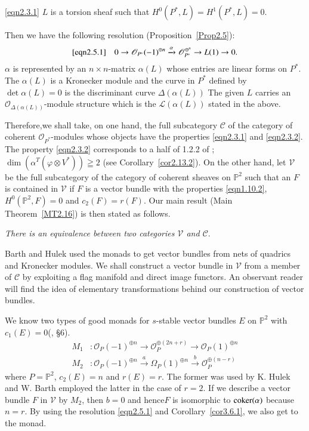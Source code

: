 \eqref{eqn2.3.1} $L$ is a torsion sheaf such that $H^{0}(P^{\ast},L)= H^{1}(P^{\ast},L)=0$.

Then we have the following resolution (Proposition~\ref{Prop2.5}):
$$\eqref{eqn2.5.1}
\quad 0\rightarrow\mathscr{O}_{P^{\ast}}(-1)^{\oplus
  n}\xrightarrow{\alpha}\mathscr{O}^{\oplus^{n}}_{P^{\ast}}\rightarrow
L(1)\rightarrow 0.
$$
$\alpha$ is represented by an $n\times n$-matrix $\alpha(L)$ whose
entries are linear forms on $P^{\ast}$. The $\alpha(L)$ is a Kronecker
module and the curve in $P^{\ast}$ defined by $\det \alpha(L)=0$ is
the discriminant curve $\Delta(\alpha(L))$ The given $L$ carries an
$\mathscr{O}_{\Delta(\alpha(L))}$-module structure which is the
$\mathscr{L}(\alpha(L))$ stated in the above.

Therefore,\pageoriginale we shall take, on one hand, the full subcategory
$\mathscr{C}$ of the category of coherent
$\mathscr{O}_{P^{\ast}}$-modules whose objects have the properties
\eqref{eqn2.3.1} and \eqref{eqn2.3.2}. The property \eqref{eqn2.3.2}
corresponds to a half of 1.2.2 of \cite{key7}; 
$\dim\left(\alpha^{T}(\varphi \otimes
V^{\ast})\right)\geqq 2$ (see Corollary~\ref{cor2.13.2}). On the other hand,
let $\mathscr{V}$ be the full subcategory of the category of coherent
sheaves on $\mathbb{P}^{2}$ such that an $F$ is contained in
$\mathscr{V}$ if $F$ is a vector bundle with the properties \eqref{eqn1.10.2},
$H^{0}\left(\mathbb{P}^{2},F\right)=0$ and $c_2(F)=r(F)$. Our main
result (Main Theorem~\ref{MT2.16}) is then stated as follows.

\begin{TM}
\textit{There is an equivalence between two categories $\mathscr{V}$ and $\mathscr{C}$}.
\end{TM}

Barth \cite{key2} and Hulek \cite{key7} used the monads to get vector
bundles from nets of quadrics and Kronecker modules. We shall
construct a vector bundle in $\mathscr{V}$ from a member of
$\mathscr{C}$ by exploiting a flag manifold and direct image
functors. An observant reader will find the idea of elementary
transformations behind our construction of vector bundles.

We know two types of good monads for $s$-stable vector bundles $E$ on
$\mathbb{P}^{2}$ with $c_1(E)=0$(\cite{key3}, \S 6).
\begin{align*}
M_1&:\mathscr{O}_P(-1)^{\oplus n}\rightarrow\mathscr{O}^{\oplus
  (2n+r)}_P\rightarrow \mathscr{O}_P(1)^{\oplus n}\\
M_2&: \mathscr{O}_P(-1)^{\oplus n}\xrightarrow{a}\Omega_P(1)^{\oplus
  n}\xrightarrow{b}\mathscr{O}_P^{\oplus (n-r)}
\end{align*}
where $P=\mathbb{P}^{2}$, $c_2(E)=n$ and $r(E)=r$. The former was used
by K. Hulek and W. Barth employed the latter in the case of $r=2$. If we
describe a vector bundle $F$ in $\mathscr{V}$ by $M_2$, then $b=0$ and
hence\pageoriginale $F$ is isomorphic to $\operatorname{coker}(\alpha)$ because
$n=r$. By using the resolution \eqref{eqn2.5.1} and
Corollary~\ref{cor3.6.1}, we also get to the monad.

